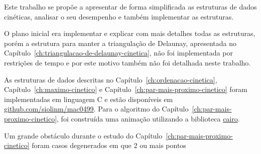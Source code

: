
\label{cap:conclusao}

Este trabalho se propõe a apresentar de forma simplificada as estruturas de dados cinéticas, analisar o seu desempenho e
também implementar as estruturas.

O plano inicial era implementar e explicar com mais detalhes todas as estruturas, porém a estrutura para manter a
triangulação de Delaunay, apresentada no Capítulo~\ref{ch:triangulacao-de-delaunay-cinetica},
não foi implementada por restrições de tempo e por este motivo também não foi detalhada neste trabalho.

As estruturas de dados descritas no Capítulo~\ref{ch:ordenacao-cinetica},
Capítulo~\ref{ch:maximo-cinetico} e Capítulo~\ref{ch:par-mais-proximo-cinetico} foram implementadas
em linguagem C e estão disponíveis em \href{https://github
.com/siolinm/mac0499/tree/main/implementacao}{github.com/siolinm/mac0499}.
Para o algoritmo do Capítulo~\ref{ch:par-mais-proximo-cinetico}, foi construída uma animação
utilizando a biblioteca \href{https://www.cairographics.org/}{cairo}.

Um grande obstáculo durante o estudo do Capítulo~\ref{ch:par-mais-proximo-cinetico} foram casos degenerados em que $2$
ou mais pontos


